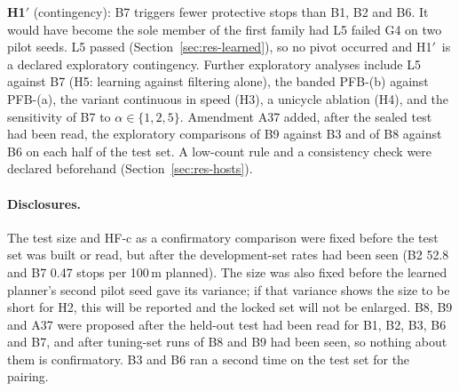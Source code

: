 \documentclass[11pt]{article}
\newcommand{\Hprime}{H1$'$}
\theoremstyle{definition}
\begin{document}
\textbf{\Hprime} (contingency): B7 triggers fewer protective stops than B1, B2 and B6. It would have become the
sole member of the first family had L5 failed G4 on two pilot seeds. L5 passed
(Section~\ref{sec:res-learned}), so no pivot occurred and \Hprime\ is a declared exploratory contingency. Further
exploratory analyses include L5 against B7 (H5: learning against filtering alone), the banded PFB-(b)
against PFB-(a), the variant continuous in speed (H3), a unicycle ablation (H4), and the sensitivity of B7 to $\alpha\in\{1,2,5\}$. Amendment A37 added, after the sealed test had been read, the exploratory comparisons of B9 against B3 and of B8 against B6 on each half of the test set. A low-count rule and a consistency check were declared beforehand (Section~\ref{sec:res-hosts}).

\paragraph{Disclosures.} The test size and HF-c as a confirmatory comparison were fixed before the test set was
built or read, but after the development-set rates had been seen (B2 52.8 and B7 0.47 stops per 100\,m
planned). The size was also fixed before the learned planner's second pilot seed gave its variance; if that
variance shows the size to be short for H2, this will be reported and the locked set will not be enlarged. B8, B9 and
A37 were proposed after the held-out test had been read for B1, B2, B3, B6 and B7, and after tuning-set runs of B8 and B9
had been seen, so nothing about them is confirmatory. B3 and B6 ran a second time on the test set for the pairing.
\end{document}
